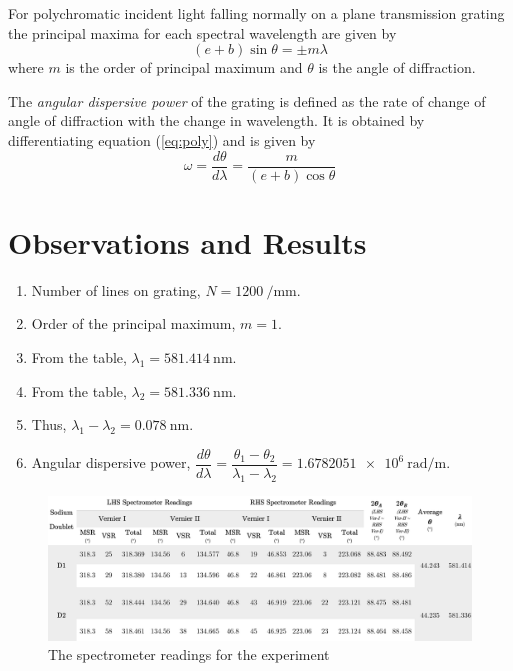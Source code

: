 \documentclass{article}
\begin{document}
\par
\noindent
For polychromatic incident light falling normally on a plane transmission grating the principal maxima for each spectral wavelength are given by
\begin{equation}
    \label{eq:poly}
    (e+b) \sin \theta = \pm m \lambda
\end{equation}
where $m$ is the order of principal maximum and $\theta$ is the angle of diffraction.
\par
\noindent
The \textit{angular dispersive power} of the grating is defined as the rate of change of angle of diffraction with the change in wavelength. It is obtained by differentiating equation (\ref{eq:poly}) and is given by
\begin{equation}
    \label{eq:power}
    \omega = \dfrac{d \theta}{d \lambda} = \dfrac{m}{(e+b) \cos \theta}
\end{equation}


\section{Observations and Results}
\begin{enumerate}
    \item Number of lines on grating, $N = \SI{1200}{\per \milli \metre}$.
    \item Order of the principal maximum, $m =1$.
    \item From the table, $\lambda_1 = \SI{581.414}{\nano \metre}$.
    \item From the table, $\lambda_2 = \SI{581.336}{\nano \metre}$.
    \item Thus, $\lambda_1 - \lambda_2 = \SI{0.078}{\nano \metre}$.
    \item Angular dispersive power, $\dfrac{d \theta}{d \lambda} = \dfrac{\theta_1 - \theta_2}{\lambda_1 - \lambda_2} = \SI{1.6782051e6}{\radian \per \metre}$.
\end{enumerate}
\begin{figure}[h!]
    \centering
    \includegraphics[scale = 0.059]{Figures/table (1).png}
    \caption{The spectrometer readings for the experiment}
    \label{tab:read}
\end{figure}
\end{document}
